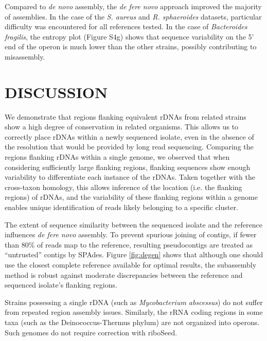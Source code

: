 \documentclass[a4,center,fleqn]{NAR}
\begin{document}
Compared to \textit{de novo} assembly, the \textit{de fere novo} approach improved the majority of assemblies. In the case of the \textit{S. aureus} and \textit{R. sphaeroides} datasets, particular difficulty was encountered for all references tested. In the case of \textit{Bacteroides fragilis}, the entropy plot (Figure S4g) shows that sequence variability on the 5' end of the operon is much lower than the other strains, possibly contributing to misassembly.

\section*{DISCUSSION}
We demonstrate that regions flanking equivalent rDNAs from related strains show a high degree of conservation in related organisms. This allows us to correctly place rDNAs within a newly sequenced isolate, even in the absence of the resolution that would be provided by long read sequencing. Comparing the regions flanking rDNAs within a single genome, we observed that when considering sufficiently large flanking regions, flanking sequences show enough variability to differentiate each instance of the rDNAs. Taken together with the cross-taxon homology, this allows inference of the location (i.e. the flanking regions) of rDNAs, and the variability of these flanking regions within a genome enables unique identification of reads likely belonging to a specific cluster.

The extent of sequence similarity between the sequenced isolate and the reference influences \textit{de fere novo} assembly. To prevent spurious joining of contigs, if fewer than 80\% of reads map to the reference, resulting pseudocontigs are treated as ``untrusted'' contigs by SPAdes. Figure \ref{fig:degen} shows that although one should use the closest complete reference available for optimal results, the subassembly method is robust against moderate discrepancies between the reference and sequenced isolate's flanking regions.

Strains possessing a single rDNA (such as \textit{Mycobacterium abscessus}) do not suffer from repeated region assembly issues. Similarly, the rRNA coding regions in some taxa (such as the Deinococcus-Thermus phylum) are not organized into operons. Such genomes do not require correction with riboSeed.
\end{document}
